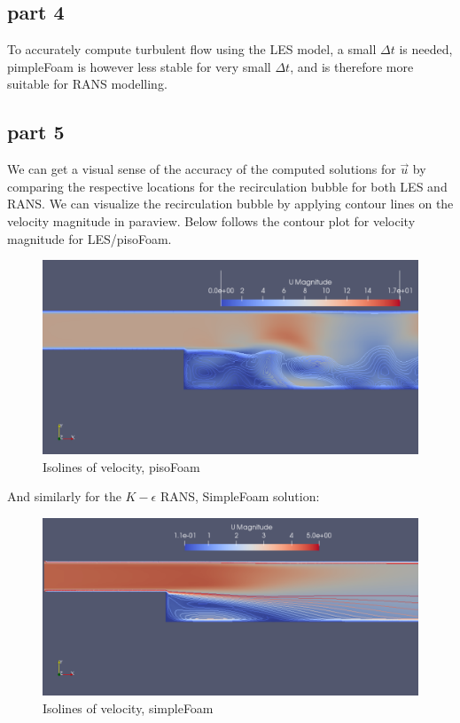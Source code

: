 \documentclass[paper=a4, fontsize=11pt]{article} %
\numberwithin{equation}{section} %
\numberwithin{figure}{section} %
\numberwithin{table}{section} %
\begin{document}
    \subsection*{part 4}
    To accurately compute turbulent flow using the LES model, a small $\Delta t$ is needed, pimpleFoam is however less stable for very small $\Delta t$, and is therefore more suitable for RANS modelling.
    
    \subsection*{part 5}
    We can get a visual sense of the accuracy of the computed solutions for $\overrightarrow{u}$ by comparing the respective locations for the recirculation bubble for both LES and RANS. We can visualize the recirculation bubble by applying contour lines on the velocity magnitude in paraview. Below follows the contour plot for velocity magnitude for LES/pisoFoam.

    \begin{figure}[h]
        \centering
        \includegraphics[width=0.6\linewidth]{Figures/isolines_U_mag_pisoFoam_refined}
        \caption{Isolines of velocity, pisoFoam}
        \label{fig:IsoPiso}
    \end{figure}
    
    And similarly for the $K-\epsilon$ RANS, SimpleFoam solution:

    \begin{figure}[h!]
        \centering
        \includegraphics[width=0.6\linewidth]{Figures/isolines_U_mag_simpleFoam}
        \caption{Isolines of velocity, simpleFoam}
        \label{fig:IsoSimple}
    \end{figure}
\end{document}
